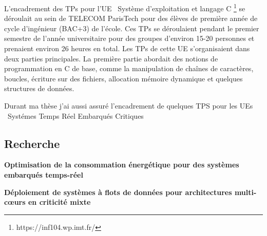\documentclass{article}
\begin{document}
L'encadrement des TPs pour l'UE \guillemotleft\ 
Système d'exploitation et langage C 
\guillemotright\footnote{https://inf104.wp.imt.fr/} se déroulait au sein de TELECOM ParisTech pour des 
élèves de première année de cycle d'ingénieur (BAC+3) de l'école. Ces TPs se déroulaient pendant le 
premier semestre de l'année universitaire pour des groupes d'environ 15-20 personnes et prenaient environ 
26 heures en total. Les TPs de cette UE s'organisaient dans deux parties principales. La première partie 
abordait des notions de programmation en C de base, comme la manipulation de chaînes de caractères, 
boucles, écriture sur des fichiers, allocation mémoire dynamique et quelques structures de données.
\vspace{.5cm}

Durant ma thèse j'ai aussi assuré l'encadrement de quelques TPS pour les UEs \guillemotleft\ 
Systémes 
Temps Réel Embarqués Critiques \guillemotright

\subsection{Recherche}

\textbf{Optimisation de la consommation énergétique pour des systèmes embarqués temps-réel}


\textbf{Déploiement de systèmes à flots de données pour architectures multi-c\oe{}urs en criticité mixte}
\end{document}
